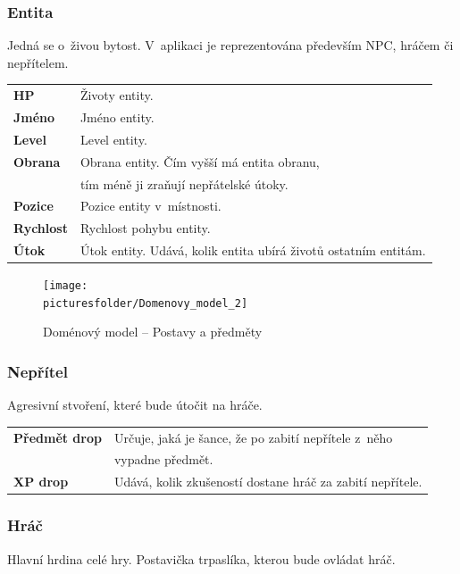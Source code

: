 \documentclass[12pt,a4paper]{article}
\def\picturesfolder{obrazky}
\begin{document}
\subsubsection{Entita}
Jedná se o~živou bytost. V~aplikaci je reprezentována především NPC, hráčem či
nepřítelem. \\[5pt]

\begin{tabular*}{0.87\textwidth}{ll}
  \bf HP & Životy entity. \\ [7pt]
  \bf Jméno & Jméno entity. \\ [7pt]
  \bf Level & Level entity. \\ [7pt]
  \bf Obrana & Obrana entity. Čím vyšší má entita obranu,\\
  \bf        & tím méně ji zraňují nepřátelské útoky. \\ [7pt]
  \bf Pozice & Pozice entity v~místnosti. \\ [7pt]
  \bf Rychlost & Rychlost pohybu entity. \\ [7pt]
  \bf Útok & Útok entity. Udává, kolik entita ubírá životů ostatním entitám. \\ [7pt]
\end{tabular*}

\begin{figure}
\begin{center}
  \texttt{[image: \\picturesfolder/Domenovy\_model\_2]}
  \caption{Doménový model -- Postavy a předměty}
  \label{domenovy:postavy}
\end{center}
\end{figure}

\subsubsection{Nepřítel}
Agresivní stvoření, které bude útočit na hráče.\\[5pt]

\begin{tabular*}{0.87\textwidth}{ll}
  \bf Předmět drop & Určuje, jaká je šance, že po zabití nepřítele z~něho\\
                   & vypadne předmět. \\[7pt]
  \bf XP drop & Udává, kolik zkušeností dostane hráč za zabití nepřítele.\\[7pt]
\end{tabular*}

\subsubsection{Hráč}
Hlavní hrdina celé hry. Postavička trpaslíka, kterou bude ovládat hráč.\\[5pt]
\end{document}
